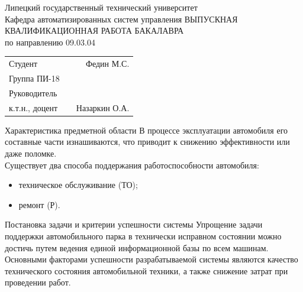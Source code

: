 \documentclass{beamer}
\begin{document}
\begin{frame}
    \begin{center}
        Липецкий государственный технический университет\\
        Кафедра автоматизированных систем управления
        \vfill
        \uppercase{ВЫПУСКНАЯ КВАЛИФИКАЦИОННАЯ РАБОТА БАКАЛАВРА}\\
        по направлению 09.03.04 \\
    \end{center}
    \vfill
    \begin{tabularx}{\textwidth}{Lm{4cm}R}
        Студент & & Федин М.С. \\
        Группа ПИ-18 & & \\
        Руководитель & & \\
        к.т.н., доцент & & Назаркин О.А.
    \end{tabularx}
\end{frame}

\begin{frame}
    {Характеристика предметной области}
    В процессе эксплуатации автомобиля его составные части изнашиваются, что
    приводит к снижению эффективности или даже поломке.
    \\[\baselineskip]

    Существует два способа поддержания работоспособности автомобиля:
    \begin{itemize}
        \item техническое обслуживание (ТО);
        \item ремонт (Р).
    \end{itemize}
\end{frame}

\begin{frame}
	{Постановка задачи и критерии успешности системы}
    Упрощение задачи поддержки автомобильного парка в технически исправном
    состоянии можно достичь путем ведения единой информационной базы по всем
    машинам.
    \\[\baselineskip]

    Основными факторами успешности разрабатываемой системы являются качество
    технического состояния автомобильной техники, а также снижение затрат при
    проведении работ.
\end{frame}
\end{document}
